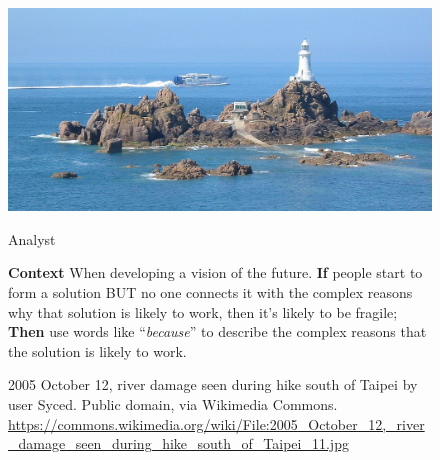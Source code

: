 \documentclass{article}
\begin{document}
\pagestyle{empty}
\thispagestyle{empty}
\pagecolor{aureolin!30}

\begin{figure}[h]
\begin{adjustbox}{minipage=[c]{\textwidth-10mm},margin= 5mm 35mm 5mm 35mm, frame=1pt, bgcolor=almond,env=center}%
\begin{center}
\includegraphics[trim=0mm 0mm 0mm 0mm, clip,width=.7\paperwidth]{lighthouse.jpg}
\end{center}

\begin{center}
\begin{minipage}[t]{0.7\paperwidth}

\medskip
{\huge Analyst}
\bigskip

\Large\raggedright
\textbf{Context} When developing a vision of the future.\newline
\textbf{If} people start to form a solution BUT no one connects it with the complex reasons why that solution is likely to work, then it’s likely to be fragile;\newline
\textbf{Then} use words like “\emph{because}” to describe the complex reasons that the solution is likely to work.
\end{minipage}
\end{center}
\caption*{2005 October 12, river damage seen during hike south of Taipei  by user Syced. Public domain, via Wikimedia Commons.\newline
\url{https://commons.wikimedia.org/wiki/File:2005_October_12,_river_damage_seen_during_hike_south_of_Taipei_11.jpg}}
\end{adjustbox}
\end{figure}
\end{document}

